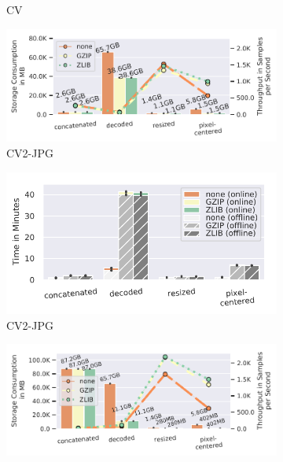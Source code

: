 {\begin{figure}
\begin{subfigure}[c]{0.21\textwidth}
        \vspace{-18pt}
        \caption{CV\footnotemark[1]}
        \label{fig:compressed-processing-time-cv}
    \end{subfigure}
    \begin{subfigure}[c]{0.26\textwidth}
        \includegraphics[width=\textwidth]{figures/cubeplusplus-jpg-pipeline/compressed-storage-vs-throughput.pdf}
        \vspace{-18pt}
        \caption{CV2-JPG}
        \label{fig:compressed-storage-vs-throughput-cv2-jpg}
    \end{subfigure}
    \begin{subfigure}[c]{0.21\textwidth}
        \includegraphics[width=\textwidth]{figures/cubeplusplus-jpg-pipeline/compression-processing-time-split.pdf}
        \vspace{-18pt}
        \caption{CV2-JPG}
        \label{fig:compressed-processing-time-cv2-jpg}
    \end{subfigure}
    \begin{subfigure}[c]{0.26\textwidth}
        \includegraphics[width=\textwidth]{figures/cubeplusplus-png-pipeline/compressed-storage-vs-throughput.pdf}

\end{subfigure}
\end{figure}}
